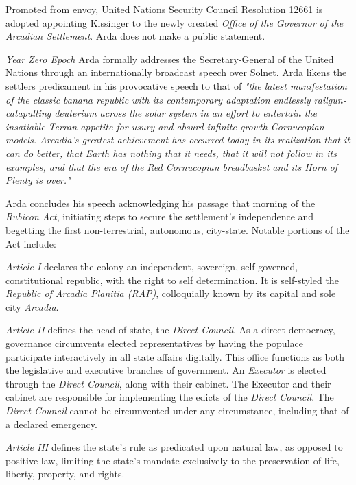 Promoted from envoy, United Nations Security Council Resolution 12661 is adopted appointing Kissinger to the newly created {\it Office of the Governor of the Arcadian Settlement}. Arda does not make a public statement.
\StopTimelineDate

{\it Year Zero Epoch}
Arda formally addresses the Secretary-General of the United Nations through an internationally broadcast speech over Solnet. Arda likens the settlers predicament in his provocative speech to that of {\it "the latest manifestation of the classic banana republic with its contemporary adaptation endlessly railgun-catapulting deuterium across the solar system in an effort to entertain the insatiable Terran appetite for usury and absurd infinite growth Cornucopian models. Arcadia's greatest achievement has occurred today in its realization that it can do better, that Earth has nothing that it needs, that it will not follow in its examples, and that the era of the Red Cornucopian breadbasket and its Horn of Plenty is over."}

Arda concludes his speech acknowledging his passage that morning of the {\it Rubicon Act}, initiating steps to secure the settlement's independence and begetting the first non-terrestrial, autonomous, city-state. Notable portions of the Act include:
\crlf

\startTimelineDocument
\startitemize[5]
\setupwhitespace[big]
\item {\it Article I} declares the colony an independent, sovereign, self-governed, constitutional republic, with the right to self determination. It is self-styled the {\it Republic of Arcadia Planitia (RAP)}, colloquially known by its capital and sole city {\it Arcadia}.

\item {\it Article II} defines the head of state, the {\it Direct Council}. As a direct democracy, governance circumvents elected representatives by having the populace participate interactively in all state affairs digitally. This office functions as both the legislative and executive branches of government. An {\it Executor} is elected through the {\it Direct Council}, along with their cabinet. The Executor and their cabinet are responsible for implementing the edicts of the {\it Direct Council}. The {\it Direct Council} cannot be circumvented under any circumstance, including that of a declared emergency.

\item {\it Article III} defines the state's rule as predicated upon natural law, as opposed to positive law, limiting the state's mandate exclusively to the preservation of life, liberty, property, and rights.

